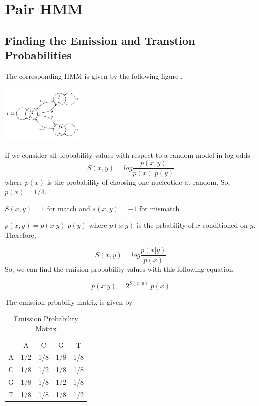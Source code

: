\documentclass[english, a4paper,11pt]{article}
\begin{document}
\section{Pair HMM}

\subsection{Finding the Emission and Transtion Probabilities}
The corresponding HMM is given by the following figure .


\begin{centering}
\includegraphics[width=0.3\textwidth]{HMM.jpg}

\end{centering}





If we consider all probability values with respect to a random model
in log-odds
$$S(x,y)=log\frac{p(x,y)}{p(x)\; p(y)}$$ where $p(x)$ is the probability of choosing one nucleotide at random. So, $p(x)=1/4$.

$S(x,y)=1$ for match and $s(x,y)=-1$ for mismatch

$p(x,y)=p(x|y)\;p(y)$ where $p(x|y)$ is the prbability of $x$ conditioned on $y$. Therefore,

$$S(x,y)=log\frac{p(x|y)}{p(x)}$$ 
So, we can find the  emision probability values with this following equation

$$p(x|y)=2^{S(x,y)}\;p(x)$$


The emission prbabiliy matrix is given by


\begin{table}[ht]
\caption{Emission Probability Matrix} %
\centering %
\begin{tabular}{c c c c c} %

-- & A  & C & G & T \\ [0.5ex] %

A & 1/2 & 1/8 & 1/8 & 1/8 \\ %
C & 1/8  & 1/2 & 1/8 & 1/8 \\
G & 1/8 & 1/8 & 1/2 & 1/8 \\
T & 1/8 & 1/8 & 1/8 & 1/2 \\ [1ex] %

\hline %
\end{tabular}
\label{table:nonlin} %
\end{table}
\end{document}
